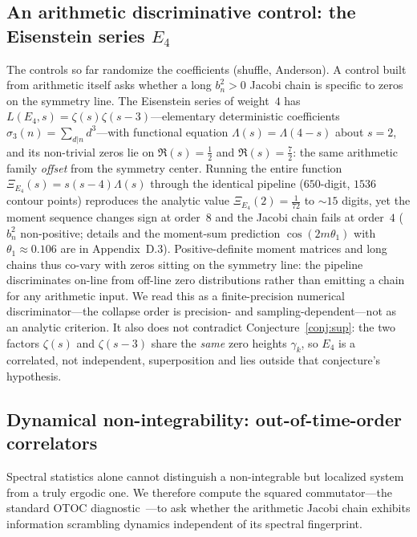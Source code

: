 \documentclass[aps,prx,reprint,floatfix]{revtex4-2}
\begin{document}
\subsection{An arithmetic discriminative control: the Eisenstein series $E_4$}
\label{sec:e4}
The controls so far randomize the coefficients (shuffle, Anderson). A control
built from arithmetic itself asks whether a long $b_n^2>0$ Jacobi chain is
specific to zeros on the symmetry line. The Eisenstein series of weight~$4$
has $L(E_4,s)=\zeta(s)\zeta(s-3)$---elementary deterministic coefficients
$\sigma_3(n)=\sum_{d|n}d^3$---with functional equation $\Lambda(s)=\Lambda(4-s)$
about $s=2$, and its non-trivial zeros lie on $\Re(s)=\tfrac12$ and
$\Re(s)=\tfrac72$: the same arithmetic family \emph{offset} from the symmetry
center. Running the entire function $\Xi_{E_4}(s)=s(s-4)\Lambda(s)$ through the
identical pipeline ($650$-digit, $1536$ contour points) reproduces the analytic
value $\Xi_{E_4}(2)=\tfrac1{72}$ to $\sim15$ digits, yet the moment sequence
changes sign at order~$8$ and the Jacobi chain fails at order~$4$ ($b_n^2$
non-positive; details and the moment-sum prediction $\cos(2m\theta_1)$ with
$\theta_1\approx0.106$ are in Appendix~D.3). Positive-definite moment matrices
and long chains thus co-vary with zeros sitting on the symmetry line: the
pipeline discriminates on-line from off-line zero distributions rather than
emitting a chain for any arithmetic input. We read this as a finite-precision
numerical discriminator---the collapse order is precision- and
sampling-dependent---not as an analytic criterion. It also does not contradict
Conjecture~\ref{conj:sup}: the two factors $\zeta(s)$ and $\zeta(s-3)$ share
the \emph{same} zero heights $\gamma_k$, so $E_4$ is a correlated, not
independent, superposition and lies outside that conjecture's hypothesis.

\subsection{Dynamical non-integrability: out-of-time-order correlators}
\label{sec:otoc}
Spectral statistics alone cannot distinguish a non-integrable but localized
system from a truly ergodic one. We therefore compute the squared
commutator---the standard OTOC diagnostic~\cite{maldacena2016}---to
ask whether the arithmetic Jacobi chain exhibits information scrambling
dynamics independent of its spectral fingerprint.
\end{document}
